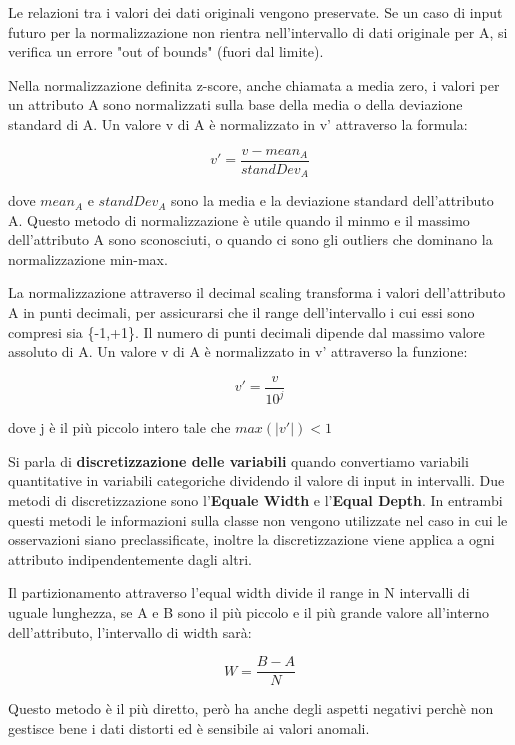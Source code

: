 \documentclass[a4paper]{extarticle}
\begin{document}
Le relazioni tra i valori dei dati originali vengono preservate. Se un caso di input futuro per la normalizzazione non rientra nell'intervallo di dati originale per A, si verifica un errore "out of bounds" (fuori dal limite).

Nella normalizzazione definita z-score, anche chiamata a media zero, i valori per un attributo A sono normalizzati sulla base della media o della deviazione standard di A. Un valore v di A è normalizzato in v' attraverso la formula:

\begin{equation*}
v'=\dfrac{v-mean_A}{standDev_A}
\end{equation*}

dove $mean_A$ e $standDev_A$ sono la media e la deviazione standard dell'attributo A. Questo metodo di normalizzazione è utile quando il minmo e il massimo dell'attributo A sono sconosciuti, o quando ci sono gli outliers che dominano la normalizzazione min-max.

La normalizzazione attraverso il decimal scaling transforma i valori dell'attributo A in punti decimali, per assicurarsi che il range dell'intervallo i cui essi sono compresi sia \{-1,+1\}. Il numero di punti decimali dipende dal massimo valore assoluto di A. Un valore v di A è normalizzato in v' attraverso la funzione:

\begin{equation*}
v'= \dfrac{v}{10^j}
\end{equation*}

dove j è il più piccolo intero tale che $max(|v'|)<1$

Si parla di \textbf{discretizzazione delle variabili} quando convertiamo variabili quantitative in variabili categoriche dividendo il valore di input in intervalli. Due metodi di discretizzazione sono l'\textbf{Equale Width} e l'\textbf{Equal Depth}. In entrambi questi metodi le informazioni sulla classe non vengono utilizzate nel caso in cui le osservazioni siano preclassificate, inoltre la discretizzazione viene applica a ogni attributo indipendentemente dagli altri. 

Il partizionamento attraverso l'equal width divide il range in N intervalli di uguale lunghezza, se A e B sono il più piccolo e il più grande valore all'interno dell'attributo, l'intervallo di width sarà:

\begin{equation*}
W=\dfrac{B-A}{N}
\end{equation*}

Questo metodo è il più diretto, però ha anche degli aspetti negativi perchè non gestisce bene i dati distorti ed è sensibile ai valori anomali.
\end{document}
